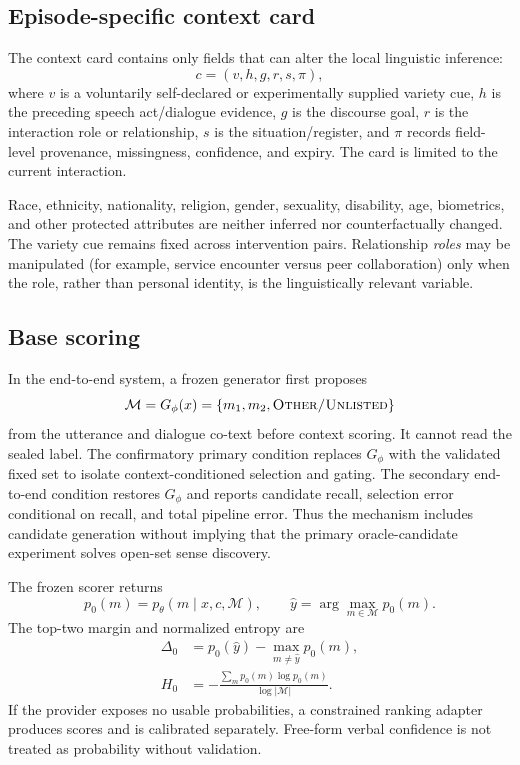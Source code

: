 \documentclass[preprint,12pt,authoryear]{elsarticle}
\begin{document}
\subsection{Episode-specific context card}

The context card contains only fields that can alter the local linguistic
inference:
\begin{equation}
c=(v,h,g,r,s,\pi),
\end{equation}
where $v$ is a voluntarily self-declared or experimentally supplied variety
cue, $h$ is the preceding speech act/dialogue evidence, $g$ is the discourse
goal, $r$ is the interaction role or relationship, $s$ is the
situation/register, and $\pi$ records field-level provenance, missingness,
confidence, and expiry. The card is limited to the current interaction.

Race, ethnicity, nationality, religion, gender, sexuality, disability, age,
biometrics, and other protected attributes are neither inferred nor
counterfactually changed. The variety cue remains fixed across intervention
pairs. Relationship \emph{roles} may be manipulated (for example, service
encounter versus peer collaboration) only when the role, rather than personal
identity, is the linguistically relevant variable.

\subsection{Base scoring}

In the end-to-end system, a frozen generator first proposes
\begin{equation}
\mathcal{M}=G_\phi(x)=\{m_1,m_2,\text{\textsc{Other/Unlisted}}\}
\end{equation}
from the utterance and dialogue co-text before context scoring. It cannot read
the sealed label. The confirmatory primary condition replaces $G_\phi$ with
the validated fixed set to isolate context-conditioned selection and gating.
The secondary end-to-end condition restores $G_\phi$ and reports candidate
recall, selection error conditional on recall, and total pipeline error. Thus
the mechanism includes candidate generation without implying that the primary
oracle-candidate experiment solves open-set sense discovery.

The frozen scorer returns
\begin{equation}
p_0(m)=p_\theta(m\mid x,c,\mathcal{M}),\qquad
\hat y=\arg\max_{m\in\mathcal{M}}p_0(m).
\end{equation}
The top-two margin and normalized entropy are
\begin{align}
\Delta_0 &=p_0(\hat y)-\max_{m\ne\hat y}p_0(m),\\
H_0 &=-\frac{\sum_m p_0(m)\log p_0(m)}{\log|\mathcal{M}|}.
\end{align}
If the provider exposes no usable probabilities, a constrained ranking
adapter produces scores and is calibrated separately. Free-form verbal
confidence is not treated as probability without validation.
\end{document}
